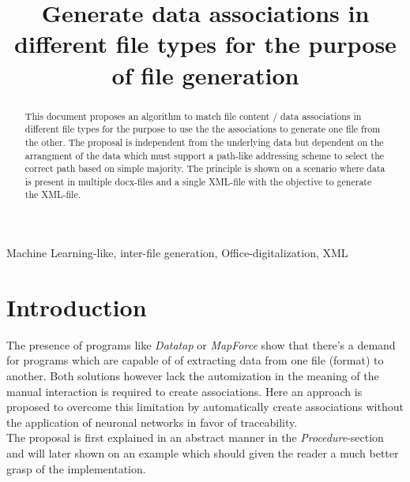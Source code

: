 \documentclass[conference]{IEEEtran}
\begin{document}
\title{Generate data associations in different file types for the purpose of file generation}
\author{
}

\maketitle

\begin{abstract}
This document proposes an algorithm to match file content / data associations in different file
types for the purpose to use the the associations to generate one file from the other. The
proposal is independent from the underlying data but dependent on the arrangment of the data which
must support a path-like addressing scheme to select the correct path based on simple majority.
The principle is shown on a scenario where data is present in multiple docx-files and a single
XML-file with the objective to generate the XML-file.
\end{abstract}

\begin{IEEEkeywords}
Machine Learning-like, inter-file generation, Office-digitalization, XML
\end{IEEEkeywords}

\section{Introduction}
The presence of programs like \textit{Datatap} \cite{adverity:adverity} or \textit{MapForce}
\cite{altova:mapforce} show that there's a demand for programs which are capable of of extracting
data from one file (format) to another. Both solutions however lack the automization in the
meaning of the manual interaction is required to create associations. Here an approach is proposed
to overcome this limitation by automatically create associations without the application of
neuronal networks in favor of traceability.\\
The proposal is first explained in an abstract manner in the \textit{Procedure}-section and
will later shown on an example which should given the reader a much better grasp of the
implementation.
\end{document}
